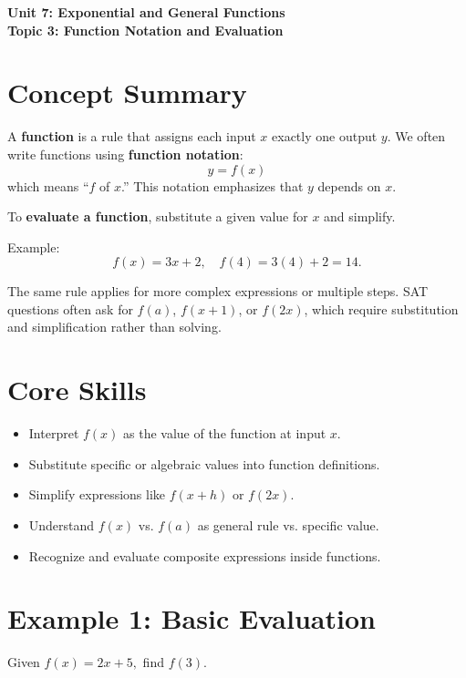 \documentclass[12pt]{article}
\begin{document}
\begin{center}
    \LARGE \textbf{Unit 7: Exponential and General Functions} \\[6pt]
    \Large \textbf{Topic 3: Function Notation and Evaluation}
\end{center}

\vspace{1em}

\section*{Concept Summary}

A \textbf{function} is a rule that assigns each input \(x\) exactly one output \(y\).  
We often write functions using \textbf{function notation}:
\[
y = f(x)
\]
which means “\(f\) of \(x\).”  
This notation emphasizes that \(y\) depends on \(x\).

To \textbf{evaluate a function}, substitute a given value for \(x\) and simplify.

Example:
\[
f(x) = 3x + 2, \quad f(4) = 3(4) + 2 = 14.
\]

The same rule applies for more complex expressions or multiple steps.  
SAT questions often ask for \(f(a)\), \(f(x+1)\), or \(f(2x)\), which require substitution and simplification rather than solving.

\section*{Core Skills}
\begin{itemize}
  \item Interpret \(f(x)\) as the value of the function at input \(x\).
  \item Substitute specific or algebraic values into function definitions.
  \item Simplify expressions like \(f(x+h)\) or \(f(2x)\).
  \item Understand \(f(x)\) vs. \(f(a)\) as general rule vs. specific value.
  \item Recognize and evaluate composite expressions inside functions.
\end{itemize}

\section*{Example 1: Basic Evaluation}

Given \(f(x) = 2x + 5,\) find \(f(3).\)
\end{document}
